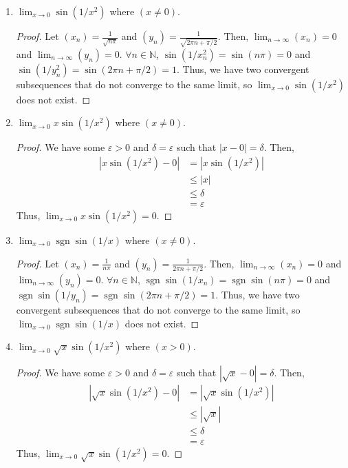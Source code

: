 \documentclass[12pt]{article}
\newcommand\N{\mathbb{N}}
\newcommand{\sgn}{\operatorname{sgn}}
\theoremstyle{remark}
\begin{document}
\begin{enumerate}[label=(\alph*)]
    \item $\lim_{x \to 0} \sin(1/x^2)$ where $(x \neq 0)$.
    \begin{proof}
        Let $(x_n) = \frac{1}{\sqrt{n\pi}}$ and $(y_n) = \frac{1}{\sqrt{2\pi n + \pi/2}}$. Then, $\lim_{n \to \infty} (x_n) = 0$ and $\lim_{n \to \infty} (y_n) = 0$. $\forall n \in \N$, $\sin(1/x_n^2) = \sin(n\pi) = 0$ and $\sin(1/y_n^2) = \sin(2\pi n + \pi/2) = 1$. Thus, we have two convergent subsequences that do not converge to the same limit, so $\lim_{x \to 0} \sin(1/x^2)$ does not exist.
    \end{proof}

    \item $\lim_{x \to 0} x \sin(1/x^2)$ where $(x \neq 0)$.
    \begin{proof}
        We have some $\varepsilon > 0$ and $\delta = \varepsilon$ such that $|x - 0| = \delta$. Then,
        \begin{align*}
            |x \sin(1/x^2) - 0| &= |x \sin(1/x^2)| \\
            &\leq |x| \\
            &\leq \delta \\
            &= \varepsilon
        \end{align*}
        Thus, $\lim_{x \to 0} x \sin(1/x^2) = 0$.
    \end{proof}

    \item $\lim_{x \to 0} \sgn \sin(1/x)$ where $(x \neq 0)$.
    \begin{proof}
        Let $(x_n) = \frac{1}{n\pi}$ and $(y_n) = \frac{1}{2\pi n + \pi/2}$. Then, $\lim_{n \to \infty} (x_n) = 0$ and $\lim_{n \to \infty} (y_n) = 0$. $\forall n \in \N$, $\sgn \sin(1/x_n) = \sgn \sin(n\pi) = 0$ and $\sgn \sin(1/y_n) = \sgn \sin(2\pi n + \pi/2) = 1$. Thus, we have two convergent subsequences that do not converge to the same limit, so $\lim_{x \to 0} \sgn \sin(1/x)$ does not exist.
    \end{proof}

    \item $\lim_{x \to 0} \sqrt{x} \sin(1/x^2)$ where $(x > 0)$.
    \begin{proof}
        We have some $\varepsilon > 0$ and $\delta = \varepsilon$ such that $|\sqrt{x} - 0| = \delta$. Then,
        \begin{align*}
            |\sqrt{x} \sin(1/x^2) - 0| &= |\sqrt{x} \sin(1/x^2)| \\
            &\leq |\sqrt{x}| \\
            &\leq \delta \\
            &= \varepsilon
        \end{align*}
        Thus, $\lim_{x \to 0} \sqrt{x} \sin(1/x^2) = 0$.
    \end{proof}
\end{enumerate}
\end{document}

